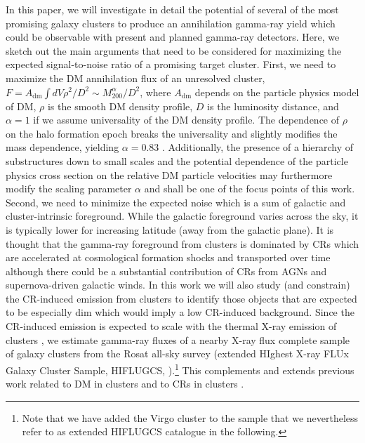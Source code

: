 \documentclass[10pt,aps,pra,reprint,amsmath,amsfonts,amssymb,showpacs,nofootinbib,floatfix]{revtex4-1}
\newcommand{\rmn}{\mathrm}
\newcommand{\mvir}{M_{200}}
\begin{document}
In this paper, we will investigate in detail the potential of several
of the most promising galaxy clusters to produce an annihilation
gamma-ray yield which could be observable with present and planned
gamma-ray detectors. Here, we sketch out the main arguments that need
to be considered for maximizing the expected signal-to-noise ratio of
a promising target cluster. First, we need to maximize the DM
annihilation flux of an unresolved cluster, $F=A_\rmn{dm} \int dV
\rho^2 / D^2 \sim \mvir^\alpha/D^2$, where $A_\rmn{dm}$ depends on the
particle physics model of DM, $\rho$ is the smooth DM density profile,
$D$ is the luminosity distance, and $\alpha=1$ if we assume
universality of the DM density profile. The dependence of $\rho$ on
the halo formation epoch breaks the universality and slightly modifies
the mass dependence, yielding $\alpha=0.83$
\cite{2009PhRvL.103r1302P}. Additionally, the presence of a hierarchy
of substructures down to small scales \cite{2008Natur.456...73S} and
the potential dependence of the particle physics cross section on the
relative DM particle velocities \cite{ArkaniHamed:2008qn} may
furthermore modify the scaling parameter $\alpha$ and shall be one of
the focus points of this work. Second, we need to minimize the
expected noise which is a sum of galactic and cluster-intrinsic
foreground. While the galactic foreground varies across the sky, it is
typically lower for increasing latitude (away from the galactic
plane). It is thought that the gamma-ray foreground from clusters is
dominated by CRs which are accelerated at cosmological formation
shocks and transported over time although there could be a substantial
contribution of CRs from AGNs and supernova-driven galactic winds. In
this work we will also study (and constrain) the CR-induced emission
from clusters to identify those objects that are expected to be
especially dim which would imply a low CR-induced background.  Since
the CR-induced emission is expected to scale with the thermal X-ray
emission of clusters \cite{2004A&A...413...17P}, we estimate gamma-ray
fluxes of a nearby X-ray flux complete sample of galaxy clusters from
the Rosat all-sky survey (extended HIghest X-ray FLUx Galaxy Cluster
Sample, HIFLUGCS,
\cite{2002ApJ...567..716R,2007A&A...466..805C}).\footnote{Note that we
  have added the Virgo cluster to the sample that we nevertheless
  refer to as extended HIFLUGCS catalogue in the following.}  This
complements and extends previous work related to DM in clusters
\cite{2006A&A...455...21C,2009PhRvD..80b3005J,2011arXiv1104.3530S,2011ApJ...726L...6C}
and to CRs in clusters
\cite{2010MNRAS.409..449P,2011MNRAS.410..127B,2008MNRAS.385.1211P,2009JCAP...08..002K,2010MNRAS.407.1565D}.
\end{document}
